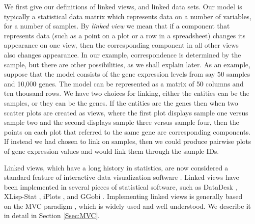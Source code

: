 \documentclass[11pt]{article}
\begin{document}
We first give our definitions of linked views, and
linked data sets.  Our model is typically a statistical data
matrix which represents data on a number of variables, for a
number of samples.  By \textit{linked view} we mean that if a
component that represents data (such as a point on a plot or a row in
a spreadsheet) changes its appearance on one view, then the
corresponding component in all other views also changes appearance.
In our example, correspondence is determined by the sample,
but there are other possibilities, as we shall explain later.  As an
example, suppose that the model consists of the gene expression levels
from say 50 samples and 10,000 genes.  The model can be represented as
a matrix of 50 columns and ten thousand rows.  We have two choices for
linking, either the entities can be the samples, or they can be the
genes. If the entities are the genes then when two scatter plots are
created as views, where the first plot displays sample one versus sample two 
and the second displays sample three versus sample four, then the points
on each plot that referred to the same gene are corresponding
components.  If instead we had chosen to link on samples, then we
could produce pairwise plots of gene expression values and would link
them through the sample IDs.

Linked views, which have a long history in statistics, are now
considered a standard feature of interactive data visualization
software \cite{GGobi}.  Linked views have been implemented in several
pieces of statistical software, such as DataDesk \cite{DataDesk},
XLisp-Stat \cite{Lisp}, iPlots \cite{iPlots}, and GGobi \cite{GGobiMan}.  
Implementing linked views is generally based on the MVC paradigm
\cite{DesignPatterns}, which is widely used and well understood.  We describe
it in detail in Section \ref{Ssec:MVC}.

\end{document}
